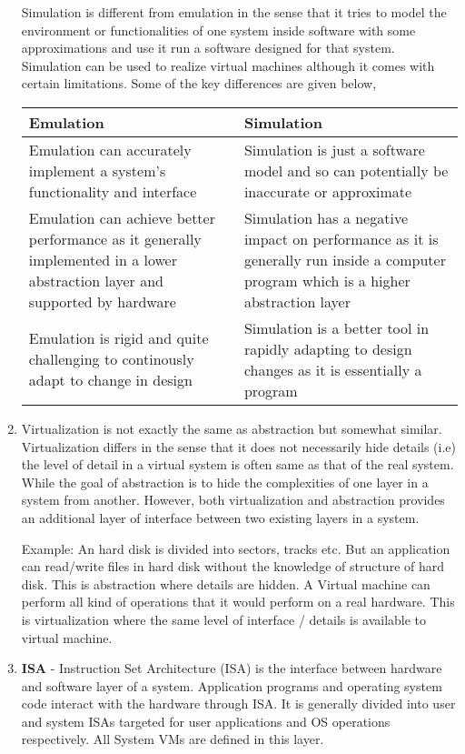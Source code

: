 \documentclass[11pt,a4paper,oneside]{article}
\begin{document}
\begin{enumerate}
		Simulation is different from emulation in the sense that it tries to model the environment or functionalities of one system inside software with some approximations and use it run a software designed for that system. Simulation can be used to realize virtual machines although it comes with certain limitations. Some of the key differences are given below,
		
		\begin{center}
			\begin{tabular}{|p{6cm}|p{6cm}|}
				\hline 
				\textbf{Emulation}  & \textbf{Simulation} \\
				\hline
				Emulation can accurately implement a system's functionality and interface & Simulation is just a software model and so can potentially be inaccurate or approximate\\
				\hline
				Emulation can achieve better performance as it generally implemented in a lower abstraction layer and supported by hardware & Simulation has a negative impact on performance as it is generally run inside a computer program which is a higher abstraction layer\\
				\hline 
				Emulation is rigid and quite challenging to continously adapt to change in design & Simulation is a better tool in rapidly adapting to design changes as it is essentially a program \\ 
				\hline
				\end{tabular}
		\end{center}	
		
		\item Virtualization is not exactly the same as abstraction but somewhat similar. Virtualization differs in the sense that it does not necessarily hide details (i.e) the level of detail in a virtual system is often same as that of the real system. While the goal of abstraction is to hide the complexities of one layer in a system from another. However, both virtualization and abstraction provides an additional layer of interface between two existing layers in a system.
		
	    Example: An hard disk is divided into sectors, tracks etc. But an application can read/write files in hard disk without the knowledge of structure of hard disk. This is abstraction where details are hidden. A Virtual machine can perform all kind of operations that it would perform on a real hardware. This is virtualization where the same level of interface / details is available to virtual machine. 
		
		\item \textbf{ISA} - Instruction Set Architecture (ISA) is the interface between hardware and software layer of a system. Application programs and operating system code interact with the hardware through ISA. It is generally divided into user and system ISAs targeted for user applications and OS operations respectively. All System VMs are defined in this layer.
		

\end{enumerate}
\end{document}
